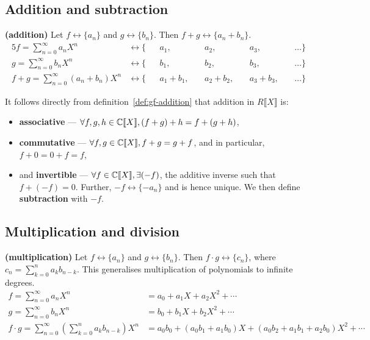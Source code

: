 \documentclass[a4paper, 12pt]{report}
\begin{document}
\subsection{Addition and subtraction}
\begin{defn}\label{def:gf-addition}
\textbf{(addition)} Let $f \longleftrightarrow \{a_n\}$ and $g \longleftrightarrow \{b_n\}$. Then $f + g \longleftrightarrow \{a_n + b_n\}$.
\begin{alignat*}{5}
    f = \sum_{n = 0}^\infty a_n X^n &\longleftrightarrow \{&&a_1, &&a_2, &&a_3, &&\dots\}\\
    g = \sum_{n = 0}^\infty b_n X^n &\longleftrightarrow \{&&b_1, &&b_2, &&b_3, &&\dots\}\\
    f + g = \sum_{n = 0}^\infty (a_n + b_n) X^n &\longleftrightarrow \{&&a_1 + b_1,~&&a_2 + b_2,~&&a_3 + b_3,~&&\dots\}
\end{alignat*}
\end{defn}
\begin{rem}\label{rem:gf-addition-properties}
It follows directly from definition~\ref{def:gf-addition} that addition in $R\llbracket X \rrbracket$ is:
\begin{itemize}
    \item \textbf{associative} --- $\forall f, g, h \in \mathbb{C}\llbracket X \rrbracket, (f + g) + h = f + (g + h)$,
    \item \textbf{commutative} --- $\forall f, g \in \mathbb{C}\llbracket X \rrbracket, f + g = g + f$, and in particular, $f + 0 = 0 + f = f$,
    \item and \textbf{invertible} --- $\forall f \in \mathbb{C}\llbracket X \rrbracket, \exists ({-f})$, the additive inverse such that $f + (-f) = 0$. Further, $-f \longleftrightarrow \{-a_n\}$ and is hence unique. We then define \textbf{subtraction} with $-f$.
\end{itemize}
\end{rem}

\subsection{Multiplication and division}
\begin{defn}\label{def:gf-multiplication}
\textbf{(multiplication)} Let $f \longleftrightarrow \{a_n\}$ and $g \longleftrightarrow \{b_n\}$. Then $f \cdot g \longleftrightarrow \{c_n\}$, where $c_n = \sum_{k = 0}^{n} a_k b_{n - k}$. This generalises multiplication of polynomials to infinite degrees.
\begin{align*}
f = \sum_{n = 0}^\infty a_n X^n &= a_0 + a_1 X + a_2 X^2 + \cdots\\
g = \sum_{n = 0}^\infty b_n X^n &= b_0 + b_1 X + b_2 X^2 + \cdots\\
f \cdot g = \sum_{n = 0}^\infty \left(\sum_{k = 0}^n a_k b_{n - k}\right) X^n &= a_0 b_0 + (a_0 b_1 + a_1 b_0) X + (a_0 b_2 + a_1 b_1 + a_2 b_0) X^2 + \cdots\\
\end{align*}
\end{defn}
\end{document}
